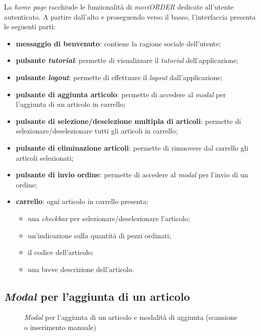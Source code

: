 La \textit{home page} racchiude le funzionalità di \textit{moviORDER} dedicate all'utente autenticato. A partire dall'alto e proseguendo verso il basso, l'interfaccia presenta le seguenti parti:
\begin{itemize}
	\item \textbf{messaggio di benvenuto}: contiene la ragione sociale dell'utente;
	\item \textbf{pulsante \textit{tutorial}}: permette di visualizzare il \textit{tutorial} dell'applicazione;
	\item \textbf{pulsante \textit{logout}}: permette di effettuare il \textit{logout} dall'applicazione;
	\item \textbf{pulsante di aggiunta articolo}: permette di accedere al \textit{modal} per l'aggiunta di un articolo in carrello; 
	\item \textbf{pulsante di selezione/deselezione multipla di articoli}: permette di selezionare/deselezionare tutti gli articoli in carrello;
	\item \textbf{pulsante di eliminazione articoli}: permette di rimuovere dal carrello gli articoli selezionati;
	\item \textbf{pulsante di invio ordine}: permette di accedere al \textit{modal} per l'invio di un ordine;
	\item \textbf{carrello}: ogni articolo in carrello presenta:
	\begin{itemize}
		\item una \textit{checkbox} per selezionare/deselezionare l'articolo;
		\item un'indicazione sulla quantità di pezzi ordinati;
		\item il codice dell'articolo;
		\item una breve descrizione dell'articolo.
	\end{itemize}
\end{itemize}

\subsection{\textit{Modal} per l'aggiunta di un articolo}

\begin{figure}[!h] 
    \centering 
    \caption{\textit{Modal} per l'aggiunta di un articolo e modalità di aggiunta (scansione o inserimento manuale)}
\end{figure}

